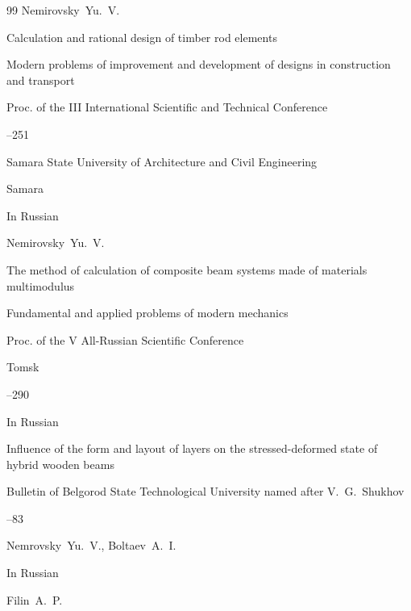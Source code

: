 \begin{thebibliography}{99}
\by Nemirovsky~Yu.~V.

\paper Calculation and rational design of timber rod elements

\inbook Modern problems of improvement and development of designs in construction and transport 

\bookinfo  Proc. of the III International Scientific and Technical Conference


--251

\publ Samara State University of Architecture and Civil Engineering

\publaddr Samara








\lang In Russian

\by Nemirovsky~Yu.~V.

\paper The method of calculation of composite beam systems made of materials multimodulus

\inbook Fundamental and applied problems of modern mechanics

\bookinfo Proc. of the V All-Russian Scientific Conference

\publaddr Tomsk


--290






\lang In Russian

\paper Influence of the form and layout of layers on the stressed-deformed state of hybrid wooden beams


\jour Bulletin of Belgorod State Technological University named after V.~G.~Shukhov 



--83

\by Nemrovsky~Yu.~V., Boltaev~A.~I.







\lang In Russian

\by  Filin~A.~P.


\end{thebibliography}
